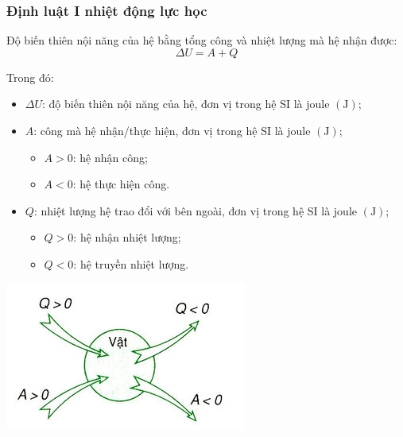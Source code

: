 \subsubsection{Định luật I nhiệt động lực học}
\begin{boxdl}
	Độ biến thiên nội năng của hệ bằng tổng công và nhiệt lượng mà hệ nhận được:
	\begin{equation}
		\Delta U= A+Q
	\end{equation}
\end{boxdl}
Trong đó:
\begin{itemize}
	\item $\Delta U$: độ biến thiên nội năng của hệ, đơn vị trong hệ SI là joule $\left(\si{\joule}\right)$;
	\item $A$: công mà hệ nhận/thực hiện, đơn vị trong hệ SI là joule $\left(\si{\joule}\right)$;
	\begin{itemize}[label=+]
		\item $A>0$: hệ nhận công;
		\item $A<0$: hệ thực hiện công.
	\end{itemize}
	\item $Q$: nhiệt lượng hệ trao đổi với bên ngoài, đơn vị trong hệ SI là joule $\left(\si{\joule}\right)$;
	\begin{itemize}[label=+]
		\item $Q>0$: hệ nhận nhiệt lượng;
		\item $Q<0$: hệ truyền nhiệt lượng.
	\end{itemize}
\end{itemize}
\begin{center}
	\includegraphics[width=0.35\linewidth]{figs/VN12-Y24-PH-SYL-003-3}
\end{center}

